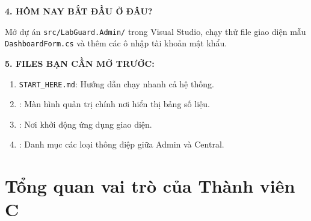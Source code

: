 \documentclass[12pt,a4paper]{article}
\begin{document}
\begin{tcolorbox}[enhanced, colback=lgLightGreen, colframe=lgForestGreen, boxrule=1pt, arc=2mm, top=2.5mm, bottom=2.5mm, left=3mm, right=3mm]
{\large\bfseries\color{lgForestGreen} 4. HÔM NAY BẮT ĐẦU Ở ĐÂU?}\par
\vspace{1mm}
Mở dự án \texttt{src/LabGuard.Admin/} trong Visual Studio, chạy thử file giao diện mẫu \texttt{DashboardForm.cs} và thêm các ô nhập tài khoản mật khẩu.
\end{tcolorbox}
\vspace{2mm}

\begin{tcolorbox}[enhanced, colback=lgLightSlate, colframe=lgSlate, boxrule=1pt, arc=2mm, top=2.5mm, bottom=2.5mm, left=3mm, right=3mm]
{\large\bfseries\color{lgSlate} 5. FILES BẠN CẦN MỞ TRƯỚC:}\par
\vspace{1mm}
\begin{enumerate}[leftmargin=1.5em, itemsep=1pt, topsep=1pt]
  \item \texttt{START\_HERE.md}: Hướng dẫn chạy nhanh cả hệ thống.
  \item {}: Màn hình quản trị chính nơi hiển thị bảng số liệu.
  \item {}: Nơi khởi động ứng dụng giao diện.
  \item {}: Danh mục các loại thông điệp giữa Admin và Central.
\end{enumerate}
\end{tcolorbox}

\newpage

\setcounter{page}{3}

\setcounter{tocdepth}{2}
\renewcommand{\contentsname}{MỤC LỤC}
\tableofcontents
\newpage

\setcounter{page}{1}


\section{Tổng quan vai trò của Thành viên C}
\end{document}
